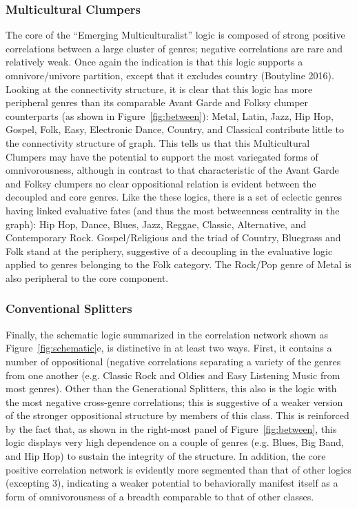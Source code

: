 \documentclass[preprint,12pt]{elsarticle}
\begin{document}
\subsubsection{Multicultural Clumpers}
The core of the ``Emerging Multiculturalist'' logic is composed of strong positive correlations between a large cluster of genres; negative correlations are rare and relatively weak. Once again the indication is that this logic supports a omnivore/univore partition, except that it excludes country (Boutyline 2016). Looking at the connectivity structure, it is clear that this logic has more peripheral genres than its comparable Avant Garde and Folksy clumper counterparts (as shown in Figure~\ref{fig:between}): Metal, Latin, Jazz, Hip Hop, Gospel, Folk, Easy, Electronic Dance, Country, and Classical contribute little to the connectivity structure of graph. This tells us that this Multicultural Clumpers may have the potential to support the most variegated forms of omnivorousness, although in contrast to that characteristic of the Avant Garde and Folksy clumpers no clear oppositional relation is evident between the decoupled and core genres. Like the these logics, there is a set of eclectic genres having linked evaluative fates (and thus the most betweenness centrality in the graph): Hip Hop, Dance, Blues, Jazz, Reggae, Classic, Alternative, and Contemporary Rock. Gospel/Religious and the triad of Country, Bluegrass and Folk stand at the periphery, suggestive of a decoupling in the evaluative logic applied to genres belonging to the Folk category. The Rock/Pop genre of Metal is also peripheral to the core component.

\subsubsection{Conventional Splitters}
Finally, the schematic logic summarized in the correlation network shown as Figure~\ref{fig:schematic}e, is distinctive in at least two ways. First, it contains a number of oppositional (negative correlations separating a variety of the genres from one another (e.g. Classic Rock and Oldies and Easy Listening Music from most genres). Other than the Generational Splitters, this also is the logic with the most negative cross-genre correlations; this is suggestive of a weaker version of the stronger oppositional structure by members of this class. This is reinforced by the fact that, as shown in the right-most panel of Figure~\ref{fig:between}, this logic displays very high dependence on a couple of genres (e.g. Blues, Big Band, and Hip Hop) to sustain the integrity of the structure.  In addition, the core positive correlation network is evidently more segmented than that of other logics (excepting 3), indicating a weaker potential to behaviorally manifest itself as a form of omnivorousness of a breadth comparable to that of other classes. 
\end{document}
